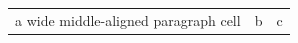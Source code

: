 \documentclass{article}
\begin{document}
\begin{tabular}{m{5cm} c c}
a wide middle-aligned paragraph cell & b & c \\
\end{tabular}
\end{document}
